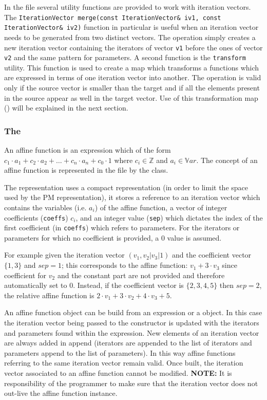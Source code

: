In the  file several utility functions are
provided to work with iteration vectors. The {\tt IterationVector merge(const
IterationVector\& iv1, const IterationVector\& iv2)} function in particular is
useful when an iteration vector needs to be generated from two distinct vectors.
The operation simply creates a new iteration vector containing the iterators of
vector {\tt v1} before the ones of vector {\tt v2} and the same pattern for
parameters. A second function is the {\tt transform} utility. This function is
used to create a map which transforms a functions which are expressed in terms
of one iteration vector into another. The operation is valid only if the source
vector is smaller than the target and if all the elements present in the source
appear as well in the target vector. Use of this transformation map
() will be explained in the next section.

\subsubsection{The }

An affine function is an expression which of the form $c_1 \cdot a_1 + c_2 \cdot
a_2 + \ldots + c_n \cdot a_n + c_0 \cdot 1$ where $c_i \in \mathbb{Z}$ and $a_i
\in \mathbb{V}ar$. The concept of an affine function is represented in the file
 by the
 class. 

The representation uses a compact representation (in order to limit the space
used by the PM representation), it stores a reference to an iteration vector
which contains the variables (i.e. $a_i$) of the affine function, a vector of
integer coefficients ({\tt coeffs}) $c_i$, and an integer value ({\tt sep})
which dictates the index of the first coefficient (in {\tt coeffs}) which refers
to parameters. For the iterators or parameters for which no coefficient is
provided, a 0 value is assumed.

For example given the iteration vector $(v_1,v_2|v_3|1)$ and the coefficient
vector $\{1,3\}$ and $sep = 1$; this corresponds to the affine function: $v_1 +
3 \cdot v_3$ since coefficient for $v_2$ and the constant part are not provided
and therefore automatically set to 0. Instead, if the coefficient vector is
$\{2,3,4,5\}$ then $sep = 2$, the relative affine function is $2 \cdot v_1 + 3
\cdot v_2 + 4 \cdot v_3 + 5$. 

An affine function object can be build from an expression or a 
object.  In this case the iteration vector being passed to the constructor is
updated with the iterators and parameters found within the expression. New
elements of an iteration vector are always added in append (iterators are
appended to the list of iterators and parameters append to the list of
parameters). In this way affine functions referring to the same iteration vector
remain valid. Once built, the iteration vector associated to an affine function
cannot be modified. {\bf NOTE:} It is responsibility of the programmer to make
sure that the iteration vector does not out-live the affine function instance.

